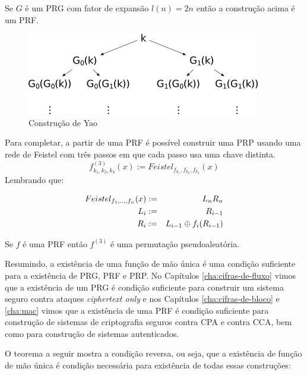 \begin{theorem}[Yao]
  Se $G$ é um PRG com fator de expansão $l(n) = 2n$ então a construção acima é um PRF.  
\end{theorem}

\begin{figure}[htbp]
  \centering
    \includegraphics[width=.7\textwidth]{imagens/PRG-PRF.png}
  \caption{Construção de Yao}
  \label{fig:owf-prg}
\end{figure}

Para completar, a partir de uma PRF é possível construir uma PRP usando uma rede de Feistel com três passos em que cada passo usa uma chave distinta.
\begin{displaymath}
  f_{k_1,k_2,k_3}^{(3)}(x) := Feistel_{f_{k_1},f_{k_2},f_{k_3}}(x)
\end{displaymath}
Lembrando que:

\begin{eqnarray*}
  Feistel_{f_1,\dots,f_n}(x) & := & L_nR_n\\
  L_i & := & R_{i-1}\\
  R_i & := & L_{i-1} \oplus f_i(R_{i-1})
\end{eqnarray*}


\begin{theorem}
  Se $f$ é uma PRF então $f^{(3)}$ é uma permutação pseudoaleatória.
\end{theorem}


Resumindo, a existência de uma função de mão única é uma condição suficiente para a existência de PRG, PRF e PRP.
No Capítulos \ref{cha:cifras-de-fluxo} vimos que a existência de um PRG é condição suficiente para construir um sistema seguro contra ataques {\em ciphertext only} e nos Capítulos \ref{cha:cifras-de-bloco} e \ref{cha:mac} vimos que a existência de uma PRF é condição suficiente para construção de sistemas de criptografia seguros contra CPA e contra CCA, bem como para construção de sistemas autenticados.

O teorema a seguir mostra a condição reversa, ou seja, que a existência de função de mão única é condição necessária para existência de todas essas construções:


